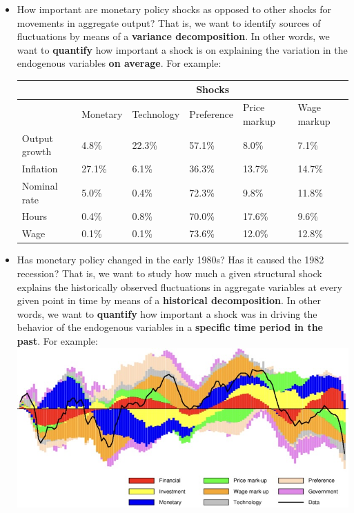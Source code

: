 \begin{itemize}
  \item How important are monetary policy shocks as opposed to other shocks for movements in aggregate output?
  That is, we want to identify sources of fluctuations by means of a \textbf{variance decomposition}.
  In other words, we want to \textbf{quantify} how important a shock is on explaining the variation in the endogenous variables \textbf{on average}.
  For example:
  \begin{center}  
  \begin{tabular}{@{}llllll@{}}
  \toprule
                & \multicolumn{5}{c}{Shocks}                                      \\ \midrule
                & Monetary & Technology & Preference & Price markup & Wage markup \\
  Output growth & 4.8\%    & 22.3\%     & 57.1\%     & 8.0\%        & 7.1\%       \\
  Inflation     & 27.1\%   & 6.1\%      & 36.3\%     & 13.7\%       & 14.7\%      \\
  Nominal rate  & 5.0\%    & 0.4\%      & 72.3\%     & 9.8\%        & 11.8\%      \\
  Hours         & 0.4\%    & 0.8\%      & 70.0\%     & 17.6\%       & 9.6\%       \\
  Wage          & 0.1\%    & 0.1\%      & 73.6\%     & 12.0\%       & 12.8\%      \\ \bottomrule
  \end{tabular}
  \end{center}
  \item Has monetary policy changed in the early 1980s? Has it caused the 1982 recession?
  That is, we want to study how much a given structural shock explains the historically observed fluctuations in aggregate variables
    at every given point in time by means of a \textbf{historical decomposition}.    
  In other words, we want to \textbf{quantify} how important a shock was in driving the behavior of the endogenous variables in a \textbf{specific time period in the past}.
  For example:\\\includegraphics*[width=\textwidth]{plots/Historical-Decomposition-of-Aggregate-Hours-Worked.jpeg}

\end{itemize}
